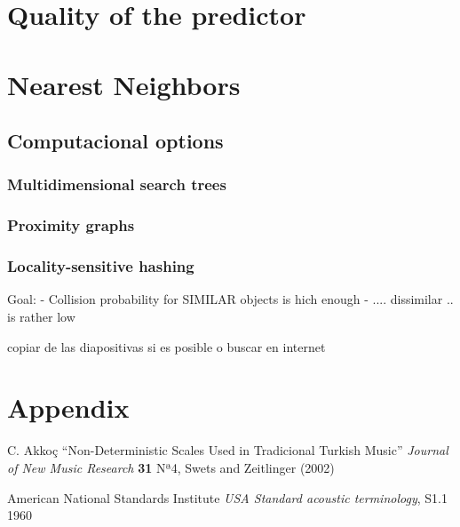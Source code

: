 \documentclass[11pt,a4paper]{article}
\begin{document}
\section{Quality of the predictor}
	
\section{Nearest Neighbors}

	\subsection{Computacional options}
	
		\subsubsection{Multidimensional search trees}
		
		
		\subsubsection{Proximity graphs}
		
		
		\subsubsection{Locality-sensitive hashing}
		
		Goal: 
		- Collision probability for SIMILAR objects is hich enough
		- ....                               dissimilar .. is rather low
		
		copiar de las diapositivas si es posible o buscar en internet
\newpage
\appendix
\section{Appendix}


	
\newpage


\begin{thebibliography}{ABC9999}

C. Akkoç
``Non-Deterministic Scales Used in Tradicional Turkish Music''
    \textit{Journal of New Music Research} \textbf{31} Nª4, Swets and Zeitlinger (2002)

American National Standards Institute
	\textit{USA Standard acoustic terminology}, S1.1 1960

\end{thebibliography}
\end{document}
